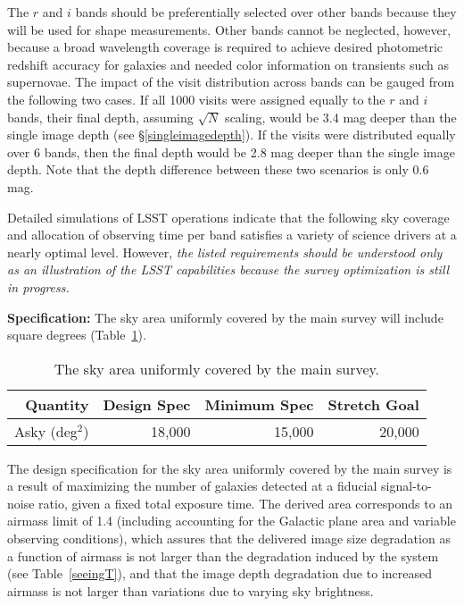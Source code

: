 The $r$ and $i$ bands should be preferentially selected over other bands
because they will be used for shape measurements. Other bands cannot
be neglected, however, because a broad wavelength coverage is required to achieve
desired photometric redshift accuracy for galaxies and needed color
information on transients such as supernovae. The impact of the visit
distribution across bands can be gauged from the following two cases. If
all 1000 visits were assigned equally to the $r$ and $i$ bands, their
final depth, assuming $\sqrt{N}$ scaling, would be 3.4 mag deeper than the
single image depth (see \S \ref{singleimagedepth}). If the visits were
distributed equally over 6 bands, then the final depth would be 2.8 mag
deeper than the single image depth. Note that the depth difference between
these two scenarios is only 0.6 mag.

Detailed simulations of LSST operations indicate that the following sky coverage and
allocation of observing time per band satisfies a variety of science drivers at a
nearly optimal level. However, \textit{the listed requirements should be
understood only as an illustration of the LSST capabilities because
the survey optimization is still in progress.}


\textbf{Specification:} The sky area uniformly covered by the main
survey will include
square degrees (Table~\ref{TskyArea}).

\begin{table}[h]
\begin{tabular}{|r|r|r|r|}
\hline
 Quantity            & Design Spec & Minimum Spec & Stretch Goal     \\
\hline
 Asky  (deg$^2$)   &  18,000      &  15,000       &  20,000        \\
\hline
\end{tabular}
\caption{The sky area uniformly covered by the main survey.}
\label{TskyArea}
\end{table}

The design specification for the sky area uniformly covered by the main
survey is a result of maximizing the number of galaxies detected at a
fiducial signal-to-noise ratio, given a fixed total exposure time.
The derived area corresponds to an airmass limit of 1.4 (including
accounting for the Galactic plane area and variable observing conditions),
which assures that the delivered image size degradation as a function of
airmass is not larger than the degradation induced by the system
(see Table~\ref{seeingT}), and that the image depth degradation due to
increased airmass is not larger than variations due to varying
sky brightness.



